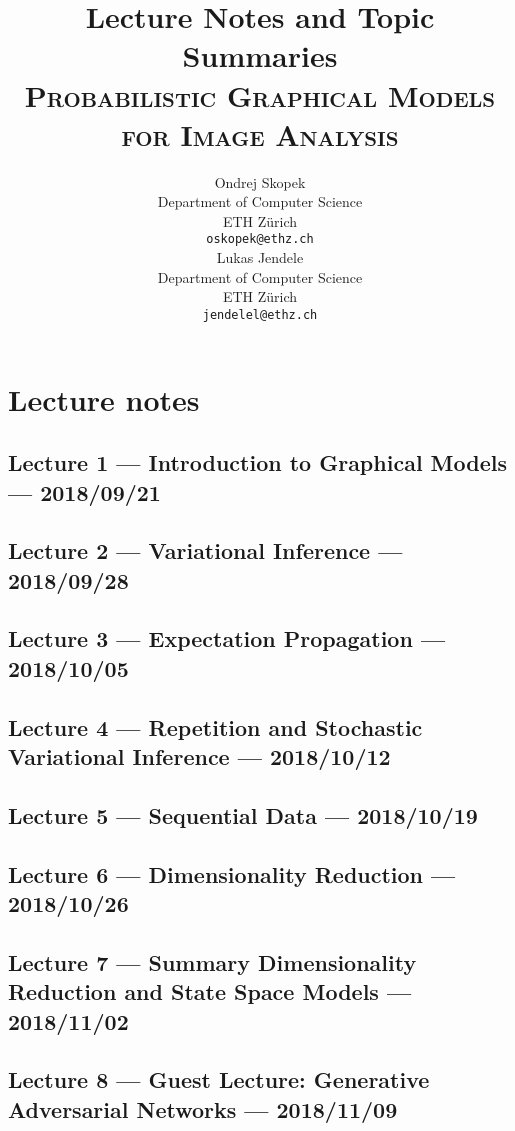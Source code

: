\documentclass{article}
\title{Lecture Notes and Topic Summaries\\{\normalfont\large \textsc{Probabilistic Graphical Models for Image Analysis}}}
\author{
  Ondrej Skopek\\
  Department of Computer Science\\
  ETH Z\"{u}rich\\
  \texttt{oskopek@ethz.ch}\\
  \And
  Lukas Jendele\\
  Department of Computer Science\\
  ETH Z\"{u}rich\\
  \texttt{jendelel@ethz.ch}\\
}
\begin{document}
\maketitle

\section{Lecture notes}

\subsection{Lecture 1 --- Introduction to Graphical Models --- 2018/09/21}

\subsection{Lecture 2 --- Variational Inference --- 2018/09/28}

\subsection{Lecture 3 --- Expectation Propagation --- 2018/10/05}

\subsection{Lecture 4 --- Repetition and Stochastic Variational Inference --- 2018/10/12}

\subsection{Lecture 5 --- Sequential Data --- 2018/10/19}

\subsection{Lecture 6 --- Dimensionality Reduction --- 2018/10/26}

\subsection{Lecture 7 --- Summary Dimensionality Reduction and State Space Models --- 2018/11/02}

\subsection{Lecture 8 --- Guest Lecture: Generative Adversarial Networks --- 2018/11/09}
\end{document}
